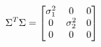 \documentclass[preview]{standalone}
\begin{document}
\begin{align*}
\special{dvisvgm:raw <g id='unique000'>}\Sigma^T \Sigma = \begin{bmatrix}\sigma_1^2 & 0 & 0 \\0 & \sigma_2^2 & 0 \\0 & 0 & 0\end{bmatrix}\special{dvisvgm:raw </g>}
\end{align*}
\end{document}
